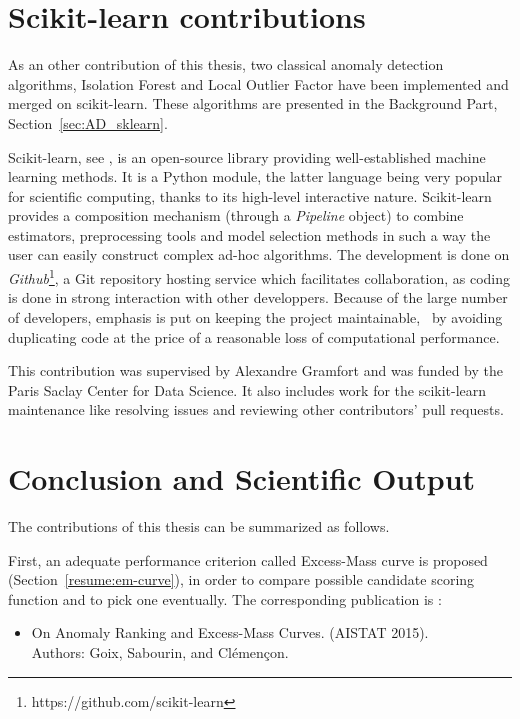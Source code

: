\section{Scikit-learn contributions}
\label{sec:impl}

As an other contribution of this thesis, two classical anomaly detection algorithms, Isolation Forest and Local Outlier Factor have been implemented and merged on scikit-learn. These algorithms are presented in the Background Part, Section~\ref{sec:AD_sklearn}. %

Scikit-learn, see \cite{sklearn2011}, is an open-source library providing well-established machine learning methods.
It is a Python module, the latter language being very popular for scientific computing, thanks to its high-level interactive nature. %
Scikit-learn provides a composition mechanism (through a \emph{Pipeline} object) to combine estimators, preprocessing tools and model selection methods in such a way the user can easily construct complex ad-hoc algorithms.
%
The development is done on \emph{Github}\footnote{https://github.com/scikit-learn}, a Git repository hosting service which facilitates collaboration, as coding is done in strong interaction with other developpers. Because of the large number of developers, emphasis is put on keeping the project maintainable, \eg~by avoiding duplicating code at the price of a reasonable loss of computational performance.%


This contribution was supervised by Alexandre Gramfort and was funded by the Paris Saclay Center for Data Science. It also includes work for the scikit-learn maintenance like resolving issues and reviewing other contributors' pull requests.



\section{Conclusion and Scientific Output}
\label{intro:concl}
The contributions of this thesis can be summarized as follows. 

First, an adequate performance criterion called Excess-Mass curve is proposed (Section~\ref{resume:em-curve}), in order to compare possible candidate scoring function and to pick one eventually. 
The corresponding publication is \cite{AISTAT15}:
\begin{itemize}
\item On Anomaly Ranking and Excess-Mass Curves. (AISTAT 2015).\\
Authors: Goix, Sabourin, and Clémençon. 
\end{itemize}

